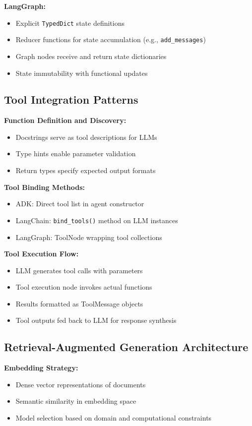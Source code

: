 \documentclass[12pt,a4paper]{article}
\begin{document}
\textbf{LangGraph:}
\begin{itemize}
    \item Explicit \texttt{TypedDict} state definitions
    \item Reducer functions for state accumulation (e.g., \texttt{add\_messages})
    \item Graph nodes receive and return state dictionaries
    \item State immutability with functional updates
\end{itemize}

\subsection{Tool Integration Patterns}

\textbf{Function Definition and Discovery:}
\begin{itemize}
    \item Docstrings serve as tool descriptions for LLMs
    \item Type hints enable parameter validation
    \item Return types specify expected output formats
\end{itemize}

\textbf{Tool Binding Methods:}
\begin{itemize}
    \item ADK: Direct tool list in agent constructor
    \item LangChain: \texttt{bind\_tools()} method on LLM instances
    \item LangGraph: ToolNode wrapping tool collections
\end{itemize}

\textbf{Tool Execution Flow:}
\begin{itemize}
    \item LLM generates tool calls with parameters
    \item Tool execution node invokes actual functions
    \item Results formatted as ToolMessage objects
    \item Tool outputs fed back to LLM for response synthesis
\end{itemize}

\subsection{Retrieval-Augmented Generation Architecture}

\textbf{Embedding Strategy:}
\begin{itemize}
    \item Dense vector representations of documents
    \item Semantic similarity in embedding space
    \item Model selection based on domain and computational constraints
\end{itemize}
\end{document}
